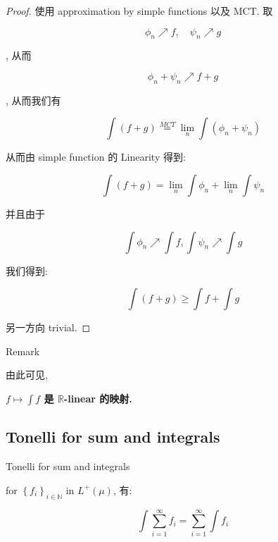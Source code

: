 \documentclass{qlnotes-export}
\begin{document}
\begin{proof}

使用 approximation by simple functions 以及 MCT. 取

\[\phi_{n}\operatorname{\nearrow ︎}f,\quad\psi_{n}\operatorname{\nearrow ︎}g\]

, 从而

\[\phi_{n} + \psi_{n}\operatorname{\nearrow ︎}f + g\]

, 从而我们有

\[\int(f + g)\overset{MCT}{=}\lim\limits_{n}\int(\phi_{n} + \psi_{n})\]

从而由 simple function 的 Linearity 得到:

\[\int(f + g) = \lim\limits_{n}\int\phi_{n} + \lim\limits_{n}\int\psi_{n}\]

并且由于

\[\int\phi_{n}\operatorname{\nearrow ︎}\int f,\int\psi_{n}\operatorname{\nearrow ︎}\int g\]

我们得到:

\[\int(f + g) \geq \int f + \int g\]

另一方向 trivial.

\end{proof}

\begin{qlremark}{Remark}

由此可见,

\textbf{\(f\mapsto\int f\) 是 \(\mathbb{R}\)-linear 的映射.}

\end{qlremark}

\subsection{Tonelli for sum and integrals}\label{tonelli-for-sum-and-integrals}

\begin{corollary}{Tonelli for sum and integrals}\label{cor-04-measurable-functions-and-integration-on-l-mu-tonelli-for-sum-and-integrals}

for \(\left\{ f_{i} \right\}_{i \in {\mathbb{N}}}\) in \(L^{+}(\mu)\), 有:

\[\int\sum\limits_{i = 1}^{\infty}f_{i} = \sum\limits_{i = 1}^{\infty}\int f_{i}\]

\end{corollary}
\end{document}
